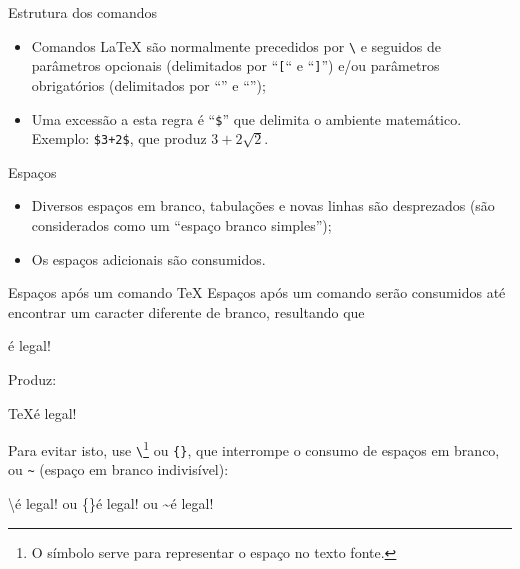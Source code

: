 \begin{frame}{Estrutura dos comandos}
\begin{itemize}
\item Comandos \LaTeX{} são normalmente precedidos por \texttt{\textbackslash} e seguidos de parâmetros opcionais (delimitados por ``\texttt{[}`` e ``\texttt{]}'') e/ou parâmetros obrigatórios (delimitados por ``\texttt{\lb}'' e ``\texttt{\rb}'');
\begin{LaTeXcode}[Exemplos]
\n
{}\n
{}\n
{}\n
{}
\end{LaTeXcode}

\bigskip

\item Uma excessão a esta regra é ``\texttt{\$}'' que delimita o ambiente matemático. Exemplo: \texttt{\$3+2\$}, que produz $3+2\sqrt{2}$.
\end{itemize}
\end{frame}

\begin{frame}{Espaços}
\begin{itemize}
\item Diversos espaços em branco, tabulações e novas linhas são desprezados (são considerados como um ``espaço branco simples'');
\item Os espaços adicionais são consumidos.
\end{itemize}
\end{frame}

\begin{frame}{Espaços após um comando \TeX}
Espaços após um comando serão consumidos até encontrar um caracter diferente de branco, resultando que
\begin{LaTeXcode}
 é legal!
\end{LaTeXcode}
Produz:

\begin{LaTeXoutput}
\TeX é legal!
\end{LaTeXoutput}

Para evitar isto, use \texttt{\textbackslash\textvisiblespace}\footnote{O símbolo \texttt{\textvisiblespace}  serve para representar o espaço no texto fonte.} ou \texttt{\{\}}, que interrompe o consumo de espaços em branco, ou \texttt{\textasciitilde} (espaço em branco indivisível):
\begin{LaTeXcode}
\textbackslash\textvisiblespace é legal!\n
ou\n
{}\{\}\textvisiblespace é legal!\n
ou\n
{}\textasciitilde é legal!
\end{LaTeXcode}
\end{frame}

